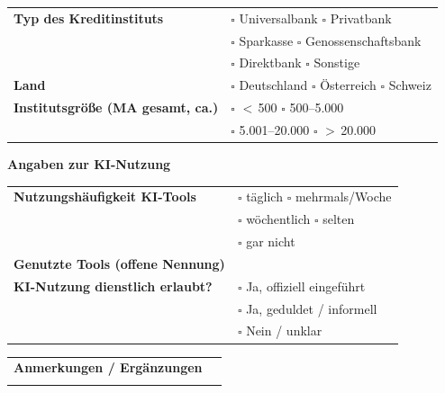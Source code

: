 \begin{tabularx}{\linewidth}{@{}lX@{}}
  \toprule
  \textbf{Typ des Kreditinstituts} &
    $\square$ Universalbank \quad
    $\square$ Privatbank \\ &
    $\square$ Sparkasse \quad
    $\square$ Genossenschaftsbank \\ &
    $\square$ Direktbank \quad
    $\square$ Sonstige \\[5pt]
  \textbf{Land} &
    $\square$ Deutschland \quad
    $\square$ Österreich \quad
    $\square$ Schweiz \\[5pt]
  \textbf{Institutsgröße (MA gesamt, ca.)} &
    $\square$ ${<}$\,500 \quad
    $\square$ 500–5.000 \\ &
    $\square$ 5.001–20.000 \quad
    $\square$ ${>}$\,20.000 \\
  \bottomrule
\end{tabularx}

\vspace{0.8em}

\noindent\textbf{Angaben zur KI-Nutzung}

\vspace{0.4em}

\begin{tabularx}{\linewidth}{@{}lX@{}}
  \toprule
  \textbf{Nutzungshäufigkeit KI-Tools} &
    $\square$ täglich \quad
    $\square$ mehrmals/Woche \\ &
    $\square$ wöchentlich \quad
    $\square$ selten \\ &
    $\square$ gar nicht \\[5pt]
  \textbf{Genutzte Tools (offene Nennung)} &
    \underline{\hspace{8cm}} \\[5pt]
  \textbf{KI-Nutzung dienstlich erlaubt?} &
    $\square$ Ja, offiziell eingeführt \\ &
    $\square$ Ja, geduldet / informell \\ &
    $\square$ Nein / unklar \\
  \bottomrule
\end{tabularx}

\vspace{0.8em}

\begin{tabularx}{\linewidth}{@{}lX@{}}
  \toprule
  \textbf{Anmerkungen / Ergänzungen} &
    \underline{\hspace{8cm}} \\[5pt]
                                     &
    \underline{\hspace{8cm}} \\
  \bottomrule
\end{tabularx}

\vspace{1em}